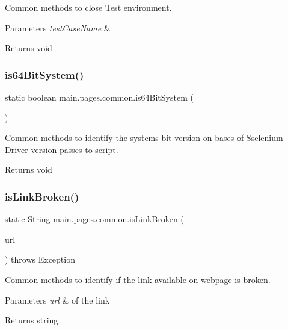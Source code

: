 Common methods to close Test environment. 
\begin{DoxyParams}{Parameters}
{\em test\+Case\+Name} & \\
\hline
\end{DoxyParams}
\begin{DoxyReturn}{Returns}
void 
\end{DoxyReturn}
\mbox{\label{classmain_1_1pages_1_1common_aa1116271e95e4d544eab6c38d160a1ab}} 
\subsubsection{\texorpdfstring{is64\+Bit\+System()}{is64BitSystem()}}
{\footnotesize\ttfamily static boolean main.\+pages.\+common.\+is64\+Bit\+System (\begin{DoxyParamCaption}{ }\end{DoxyParamCaption})\hspace{0.3cm}{\ttfamily [static]}}

Common methods to identify the systems\textquotesingle{} bit version on bases of Sselenium Driver version passes to script. \begin{DoxyReturn}{Returns}
void 
\end{DoxyReturn}
\mbox{\label{classmain_1_1pages_1_1common_a75bf8538e39f1ea3759eebeef9edfa22}} 
\subsubsection{\texorpdfstring{is\+Link\+Broken()}{isLinkBroken()}}
{\footnotesize\ttfamily static String main.\+pages.\+common.\+is\+Link\+Broken (\begin{DoxyParamCaption}\item[{U\+RL}]{url }\end{DoxyParamCaption}) throws Exception\hspace{0.3cm}{\ttfamily [static]}}

Common methods to identify if the link available on webpage is broken. 
\begin{DoxyParams}{Parameters}
{\em url} & of the link \\
\hline
\end{DoxyParams}
\begin{DoxyReturn}{Returns}
string 
\end{DoxyReturn}
\mbox{\label{classmain_1_1pages_1_1common_aedb8bb00674efe1e7b551e14d10219ba}} 
